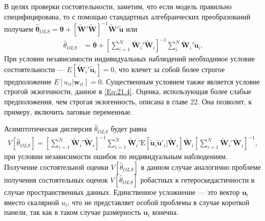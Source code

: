 В целях проверки состоятельности, заметим, что если модель правильно специфицирована, то с помощью стандартных алгебраических преобразований получаем $\hat{\bm \theta}_{OLS}=\bm\theta+[\tilde{\mathbf W}'\tilde{\mathbf W}]^{-1}\tilde{\mathbf W}'\tilde{\mathbf u}$ или 
 \begin{align}
\hat{\theta}_{OLS}
& = \bm\theta + \left[\sum^{N}_{i=1} \tilde{\mathbf W}_i'\tilde{\mathbf W}_i\right]^{-1}\sum_i^N \tilde{\mathbf W}_i'\tilde{\mathbf u}_i.
\nonumber
\end{align}
При условии независимости индивидуальных наблюдений необходимое условие состоятельности --- $E[\tilde{\mathbf W}_i'\tilde{\mathbf u}_i]=0$, что влечет за собой более строгое предположение $E[u_{it}|\mathbf w_{it}]=0$. Существенным условием также является условие строгой экзогенности, данное в \ref{Eq:21.4}. Оценка, использующая более слабые предположения, чем строгая экзогенность, описана в главе 22. Она позволит, к примеру, включить лаговые переменные.

Асимптотическая дисперсия $\hat{\theta}_{OLS}$ будет равна
 \begin{align}
V[\hat{\theta}_{OLS}]= \left[\sum^{N}_{i=1} \tilde{\mathbf W}_i'\tilde{\mathbf W}_i\right]^{-1} \sum^{N}_{i=1} \tilde{\mathbf W}_i' \mathrm E[\tilde{\mathbf u}_i \tilde{\mathbf u}'_i|\tilde{\mathbf W}_i]\tilde{\mathbf W_i} \left[\sum^{N}_{i=1} \tilde{\mathbf W}_i'\tilde{\mathbf W}_i\right]^{-1},
\nonumber
\end{align}
при условии независимости ошибок по индивидуальным наблюдениям. Получение состоятельной оценки $V[\hat\theta_{OLS}]$ в данном случае аналогично проблеме получения состоятельных оценок $V[\hat{\theta}_{OLS}]$ робастных к гетероскедастичности в случае пространственных данных. Единственное усложнение --- это вектор $\mathbf u_i$ вместо скалярной $u_i$, что не представляет особой проблемы в случае короткой панели, так как в таком случае размерность $\mathbf u_i$ конечна.

